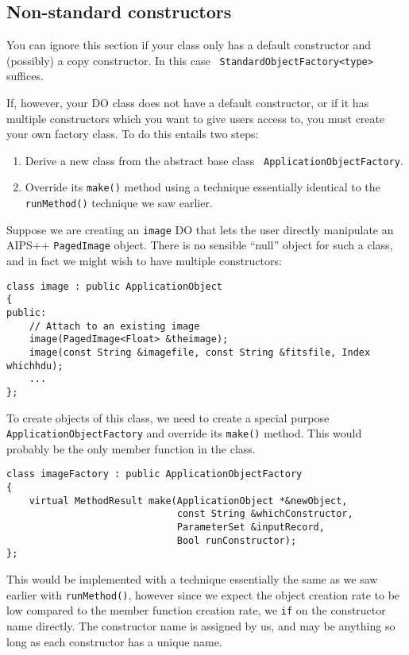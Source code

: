 \subsection{Non-standard constructors}

You can ignore this section if your class only has a default
constructor and (possibly) a copy constructor. In this case {\tt
StandardObjectFactory<type>} suffices.

If, however, your DO class does not have a default constructor, or if it has
multiple constructors which you want to give users access to, you must
create your own factory class. To do this entails two steps:
\begin{enumerate}
    \item Derive a new class from the abstract base class {\tt
    ApplicationObjectFactory}.
  \item Override its {\tt make()} method using a technique essentially
  identical to the {\tt runMethod()} technique we saw earlier.
\end{enumerate}

Suppose we are creating an {\tt image} DO that lets the user directly
manipulate an AIPS++ {\tt PagedImage} object. There is no sensible
``null'' object for such a class, and in fact we might wish to have
multiple constructors:

\begin{verbatim}
class image : public ApplicationObject
{
public:
    // Attach to an existing image
    image(PagedImage<Float> &theimage);
    image(const String &imagefile, const String &fitsfile, Index whichhdu);
    ...
};      
\end{verbatim}

To create objects of this class, we need to create a special purpose
{\tt ApplicationObjectFactory} and override its {\tt make()}
method. This would probably be the only member function in the class.

\begin{verbatim}
class imageFactory : public ApplicationObjectFactory
{
    virtual MethodResult make(ApplicationObject *&newObject,
                              const String &whichConstructor,
                              ParameterSet &inputRecord,
                              Bool runConstructor);
};
\end{verbatim}

This would be implemented with a technique essentially the same as we saw
earlier with {\tt runMethod()}, however since we expect the object
creation rate to be low compared to the member function creation rate,
we {\tt if} on the constructor name directly. The constructor name is
assigned by us, and may be anything so long as each constructor has a
unique name.

